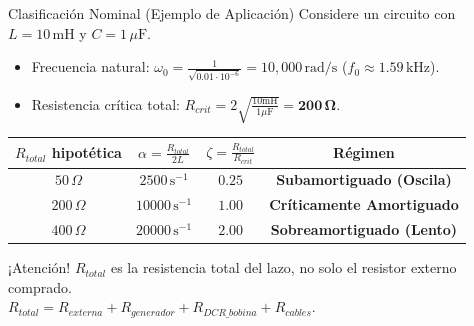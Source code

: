 \documentclass[aspectratio=169, 10pt]{beamer}
\begin{document}
\begin{frame}{Clasificación Nominal (Ejemplo de Aplicación)}
    Considere un circuito con $L = 10\,\text{mH}$ y $C = 1\,\mu\text{F}$. 
    \begin{itemize}
        \item Frecuencia natural: $\omega_0 = \frac{1}{\sqrt{0.01 \cdot 10^{-6}}} = 10,000\,\text{rad/s}$ ($f_0 \approx 1.59\,\text{kHz}$).
        \item Resistencia crítica total: $R_{crit} = 2\sqrt{\frac{10\text{mH}}{1\mu\text{F}}} = \mathbf{200\,\Omega}$.
    \end{itemize}

    \vspace{0.1cm}
    \begin{center}
    \renewcommand{\arraystretch}{1.2}
    \small
    \begin{tabular}{cccc}
    \toprule
    \textbf{$R_{total}$ hipotética} & $\alpha = \frac{R_{total}}{2L}$ & $\zeta = \frac{R_{total}}{R_{crit}}$ & \textbf{Régimen} \\
    \midrule
    $50\,\Omega$ & $2500\,\text{s}^{-1}$ & $0.25$ & \textbf{Subamortiguado (Oscila)} \\
    $200\,\Omega$ & $10000\,\text{s}^{-1}$ & $1.00$ & \textbf{Críticamente Amortiguado} \\
    $400\,\Omega$ & $20000\,\text{s}^{-1}$ & $2.00$ & \textbf{Sobreamortiguado (Lento)} \\
    \bottomrule
    \end{tabular}
    \end{center}
    
    \vspace{0.1cm}
    \begin{tcolorbox}[colback=gray!5, colframe=black, title=Física del Mundo Real, boxsep=1pt, left=4pt, right=4pt, top=2pt, bottom=2pt]
    \small
    ¡Atención! $R_{total}$ es la resistencia total del lazo, no solo el resistor externo comprado. \\
    $R_{total} = R_{externa} + R_{generador} + R_{DCR\_bobina} + R_{cables}$.
    \end{tcolorbox}
\end{frame}
\end{document}
